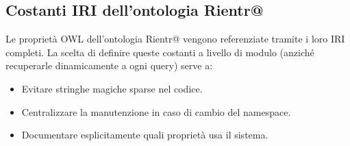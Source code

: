 \documentclass[a4paper,12pt]{article}
\begin{document}
\subsection{Costanti IRI dell'ontologia Rientr@}

Le propriet\`{a} OWL dell'ontologia Rientr@ vengono referenziate tramite
i loro IRI completi. La scelta di definire queste costanti a livello di
modulo (anzich\'{e} recuperarle dinamicamente a ogni query) serve a:

\begin{itemize}[noitemsep]
  \item Evitare stringhe magiche sparse nel codice.
  \item Centralizzare la manutenzione in caso di cambio del namespace.
  \item Documentare esplicitamente quali propriet\`{a} usa il sistema.
\end{itemize}
\end{document}
